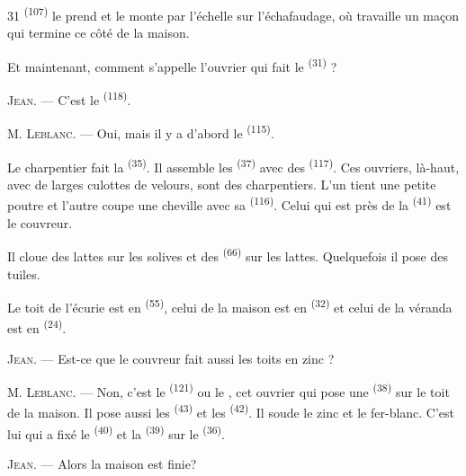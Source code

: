 \begin{VUpage}[33]{31}
\VUcontinue
{} \textsuperscript{(107)} le prend et le monte par l'échelle sur\nl
l'échafaudage, où travaille un maçon qui termine ce\nl
côté de la maison.

\VUblancAlinea
Et maintenant, comment s'appelle l'ouvrier qui fait\nl
le  \textsuperscript{(31)} ?

\VUblancAlinea
\textsc{Jean}. --- C'est le  \textsuperscript{(118)}.

\VUblancAlinea
\textsc{M. Leblanc}. --- Oui, mais il y a d'abord le \cc
{} \textsuperscript{(115)}.

\VUblancAlinea
Le charpentier fait la  \textsuperscript{(35)}. Il assemble\nl
les  \textsuperscript{(37)} avec des  \textsuperscript{(117)}. Ces ouvriers,\nl
là-haut, avec de larges culottes de velours, sont des\nl
charpentiers. L'un tient une petite poutre et l'autre\nl
coupe une cheville avec sa  \textsuperscript{(116)}. Celui qui est\nl
près de la  \textsuperscript{(41)} est le couvreur.

\VUblancAlinea
Il cloue des lattes sur les solives et des \cc
{} \textsuperscript{(66)} sur les lattes. Quelquefois il pose des tuiles.

\VUblancAlinea
Le toit de l'écurie est en  \textsuperscript{(55)}, celui de la\nl
maison est en  \textsuperscript{(32)} et celui de la véranda est\nl
en  \textsuperscript{(24)}.

\VUblancAlinea
\textsc{Jean}. --- Est-ce que le couvreur fait aussi les toits\nl
en zinc ?

\VUblancAlinea
\textsc{M. Leblanc}. --- Non, c'est le  \textsuperscript{(121)} ou le\nl
{}, cet ouvrier qui pose une  \textsuperscript{(38)} sur\nl
le toit de la maison. Il pose aussi les  \textsuperscript{(43)} et\nl
les  \textsuperscript{(42)}. Il soude le zinc et le fer-blanc.\nl
C'est lui qui a fixé le  \textsuperscript{(40)} et la\nl
{} \textsuperscript{(39)} sur le  \textsuperscript{(36)}.

\VUblancAlinea
\textsc{Jean}. --- Alors la maison est finie?


\end{VUpage}
